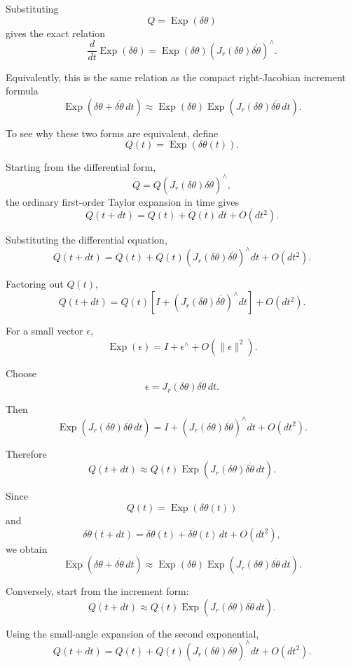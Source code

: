 \documentclass[11pt]{article}
\numberwithin{equation}{section}
\newcommand{\Exp}{\operatorname{Exp}}
\begin{document}
Substituting
\[
Q=\Exp(\delta\theta)
\]
gives the exact relation
\begin{equation}
\boxed{
\frac{d}{dt}\Exp(\delta\theta)
=
\Exp(\delta\theta)
\left(
J_r(\delta\theta)\delta\dot\theta
\right)^\wedge.
}
\end{equation}

Equivalently, this is the same relation as the compact right-Jacobian
increment formula
\[
\Exp(\delta\theta+\delta\dot\theta\,dt)
\approx
\Exp(\delta\theta)
\Exp\!\left(
J_r(\delta\theta)\delta\dot\theta\,dt
\right).
\]

To see why these two forms are equivalent, define
\[
Q(t)=\Exp(\delta\theta(t)).
\]

Starting from the differential form,
\[
\dot Q
=
Q
\left(
J_r(\delta\theta)\delta\dot\theta
\right)^\wedge,
\]
the ordinary first-order Taylor expansion in time gives
\[
Q(t+dt)
=
Q(t)+\dot Q(t)\,dt+O(dt^2).
\]

Substituting the differential equation,
\[
Q(t+dt)
=
Q(t)
+
Q(t)
\left(
J_r(\delta\theta)\delta\dot\theta
\right)^\wedge dt
+
O(dt^2).
\]

Factoring out $Q(t)$,
\[
Q(t+dt)
=
Q(t)
\left[
I+
\left(
J_r(\delta\theta)\delta\dot\theta
\right)^\wedge dt
\right]
+
O(dt^2).
\]

For a small vector $\epsilon$,
\[
\Exp(\epsilon)
=
I+\epsilon^\wedge+O(\|\epsilon\|^2).
\]

Choose
\[
\epsilon
=
J_r(\delta\theta)\delta\dot\theta\,dt.
\]

Then
\[
\Exp\!\left(
J_r(\delta\theta)\delta\dot\theta\,dt
\right)
=
I+
\left(
J_r(\delta\theta)\delta\dot\theta
\right)^\wedge dt
+
O(dt^2).
\]

Therefore
\[
Q(t+dt)
\approx
Q(t)
\Exp\!\left(
J_r(\delta\theta)\delta\dot\theta\,dt
\right).
\]

Since
\[
Q(t)=\Exp(\delta\theta(t))
\]
and
\[
\delta\theta(t+dt)
=
\delta\theta(t)
+
\delta\dot\theta(t)\,dt
+
O(dt^2),
\]
we obtain
\begin{equation}
\boxed{
\Exp(\delta\theta+\delta\dot\theta\,dt)
\approx
\Exp(\delta\theta)
\Exp\!\left(
J_r(\delta\theta)\delta\dot\theta\,dt
\right).
}
\end{equation}

Conversely, start from the increment form:
\[
Q(t+dt)
\approx
Q(t)
\Exp\!\left(
J_r(\delta\theta)\delta\dot\theta\,dt
\right).
\]

Using the small-angle expansion of the second exponential,
\[
Q(t+dt)
=
Q(t)
+
Q(t)
\left(
J_r(\delta\theta)\delta\dot\theta
\right)^\wedge dt
+
O(dt^2).
\]
\end{document}

